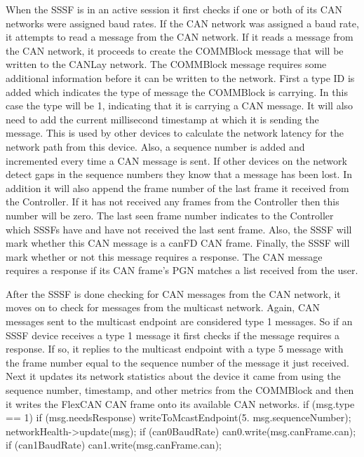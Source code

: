 \documentclass[letterpaper,twocolumn,12pt]{article}
\begin{document}
When the SSSF is in an active session it first checks if one or both of its CAN networks were assigned baud rates. If the CAN network was assigned a baud rate, it attempts to read a message from the CAN network. If it reads a message from the CAN network, it proceeds to create the COMMBlock message that will be written to the CANLay network. The COMMBlock message requires some additional information before it can be written to the network. First a type ID is added which indicates the type of message the COMMBlock is carrying. In this case the type will be 1, indicating that it is carrying a CAN message. It will also need to add the current millisecond timestamp at which it is sending the message. This is used by other devices to calculate the network latency for the network path from this device. Also, a sequence number is added and incremented every time a CAN message is sent. If other devices on the network detect gaps in the sequence numbers they know that a message has been lost. In addition it will also append the frame number of the last frame it received from the Controller. If it has not received any frames from the Controller then this number will be zero. The last seen frame number indicates to the Controller which SSSFs have and have not received the last sent frame. Also, the SSSF will mark whether this CAN message is a canFD CAN frame. Finally, the SSSF will mark whether or not this message requires a response. The CAN message requires a response if its CAN frame’s PGN matches a list received from the user.

After the SSSF is done checking for CAN messages from the CAN network, it moves on to check for messages from the multicast network. Again, CAN messages sent to the multicast endpoint are considered type 1 messages. So if an SSSF device receives a type 1 message it first checks if the message requires a response. If so, it replies to the multicast endpoint with a type 5 message with the frame number equal to the sequence number of the message it just received. Next it updates its network statistics about the device it came from using the sequence number, timestamp, and other metrics from the COMMBlock and then it writes the FlexCAN CAN frame onto its available CAN networks.
    if (msg.type == 1)
    {
        if (msg.needsResponse)
        {
            writeToMcastEndpoint(5. msg.sequenceNumber);
        }
        networkHealth->update(msg);
        if (can0BaudRate) can0.write(msg.canFrame.can);
        if (can1BaudRate) can1.write(msg.canFrame.can);
    }
\end{document}
